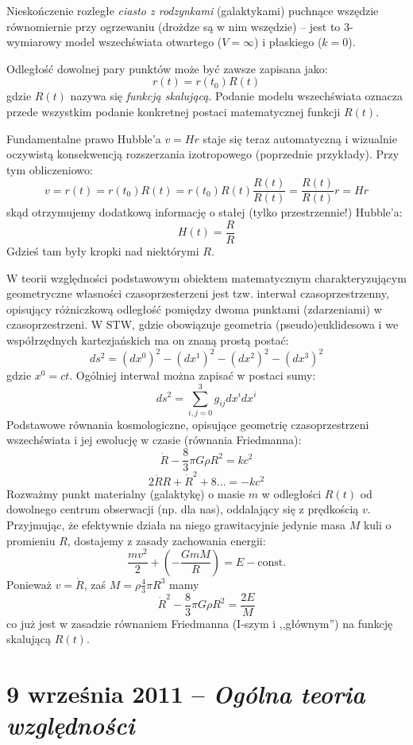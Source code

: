 \documentclass [a4paper, 11pt, oneside]{book}
\begin{document}
		Nieskończenie rozległe \textit{ciasto z rodzynkami} (galaktykami) puchnące wszędzie równomiernie przy ogrzewaniu (drożdze są w nim wszędzie) -- jest to 3-wymiarowy model wszechświata otwartego ($V = \infty$) i płaskiego ($k=0$).

		Odległość dowolnej pary punktów może być zawsze zapisana jako:
		\[
			r(t) = r(t_0)R(t)
		\]
		gdzie $R(t)$ nazywa się \textit{funkcją skalującą}. Podanie modelu wszechświata oznacza przede wszystkim podanie konkretnej postaci matematycznej funkcji $R(t)$.

		Fundamentalne prawo Hubble'a $v = Hr$ staje się teraz automatyczną i wizualnie oczywistą konsekwencją rozszerzania izotropowego (poprzednie przykłady). Przy tym obliczeniowo:
		\[
			v = r(t) = r(t_0)R(t) = r(t_0)R(t)\frac{R(t)}{R(t)} = \frac{R(t)}{R(t)}r = Hr
		\]
		skąd otrzymujemy dodatkową informację o stałej (tylko przestrzennie!) Hubble'a:
		\[
			H(t) = \frac{R}{R}
		\]
		Gdzieś tam były kropki nad niektórymi $R$.

	W teorii względności podstawowym obiektem matematycznym charakteryzującym geometryczne własności czasoprzesterzeni jest tzw. interwał czasoprzestrzenny, opisujący różniczkową odległość pomiędzy dwoma punktami (zdarzeniami) w czasoprzestrzeni. W STW, gdzie obowiązuje geometria (pseudo)euklidesowa i we współrzędnych kartezjańskich ma on znaną prostą postać:
	\[
		ds^2 = (dx^0)^2 - (dx^1)^2 - (dx^2)^2 - (dx^3)^2
	\]
	gdzie $x^0 = ct$. Ogólniej interwał można zapisać w postaci sumy:
	\[
		ds^2 = \sum^3_{i,j = 0} g_{ij}dx^idx^i
	\]
	Podstawowe równania kosmologiczne, opisujące geometrię czasoprzestrzeni wszechświata i jej ewolucję w czasie (równania Friedmanna):
	\[
		\dot R - \frac83\pi G\rho R^2 = kc^2
	\]
	\[
		2\ddot R R+\dot R^2+8\dots =-kc^2
	\]
	Rozważmy punkt materialny (galaktykę) o masie $m$ w odległości $R(t)$ od dowolnego centrum obserwacji (np. dla nas), oddalający się z prędkością $v$. Przyjmując, że efektywnie działa na niego grawitacyjnie jedynie masa $M$ kuli o promieniu $R$, dostajemy z zasady zachowania energii:
	\[
		\frac{mv^2}2 + \left(-\frac{GmM}R\right) = E-\textrm{const.}
	\]
	Ponieważ $v = \dot R$, zaś $M = \rho\frac43\pi R^3$ mamy
	\[
		\dot R^2 - \frac83\pi G\rho R^2 = \frac{2E}M
	\]
	co już jest w zasadzie równaniem Friedmanna (I-szym i ,,głównym'') na funkcję skalującą $R(t)$.


\chapter{9 września 2011 -- \textit{Ogólna teoria względności}} %
\label{cha:9_wrze_nia_2011_textit}
\end{document}
